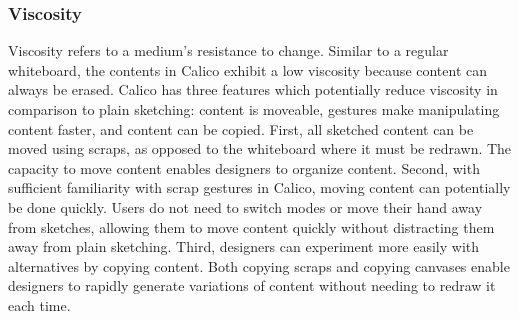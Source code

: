



\subsubsection{Viscosity}

Viscosity refers to a medium's resistance to change. Similar to a regular whiteboard, the contents in Calico exhibit a low viscosity because content can always be erased. Calico has three features which potentially reduce viscosity in comparison to plain sketching: content is moveable, gestures make manipulating content faster, and content can be copied. First, all sketched content can be moved using scraps, as opposed to the whiteboard where it must be redrawn. The capacity to move content enables designers to organize content. Second, with sufficient familiarity with scrap gestures in Calico, moving content can potentially be done quickly. Users do not need to switch modes or move their hand away from sketches, allowing them to move content quickly without distracting them away from plain sketching. Third, designers can experiment more easily with alternatives by copying content. Both copying scraps and copying canvases enable designers to rapidly generate variations of content without needing to redraw it each time.

